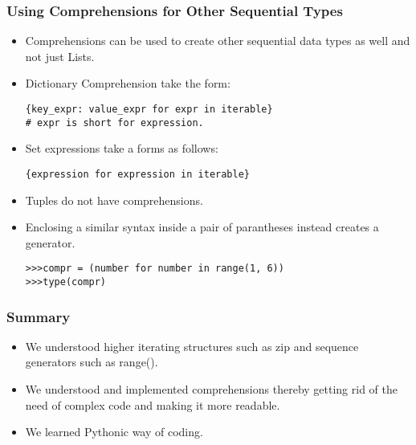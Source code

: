 \documentclass{beamer}
\begin{document}
\begin{frame}[fragile]
\frametitle{Using Comprehensions for Other Sequential Types}
\begin{itemize}
\item Comprehensions can be used to create other sequential data types as well and not just Lists.
\item Dictionary Comprehension take the form:
\begin{lstlisting}
{key_expr: value_expr for expr in iterable}
# expr is short for expression.
\end{lstlisting}
\item Set expressions take a forms as follows:
\begin{lstlisting}
{expression for expression in iterable}
\end{lstlisting}
\item Tuples do not have comprehensions. 
\item Enclosing a similar syntax inside a pair of parantheses instead creates a generator.
\begin{lstlisting}
>>>compr = (number for number in range(1, 6))
>>>type(compr)
\end{lstlisting}
\end{itemize}
\end{frame}

\begin{frame}
\frametitle{Summary}
\begin{itemize}
\item We understood higher iterating structures such as zip and sequence generators such as range().
\item We understood and implemented comprehensions thereby getting rid of the need of complex code and making it more readable.
\item We learned Pythonic way of coding.
\end{itemize}
\end{frame}
\end{document}
